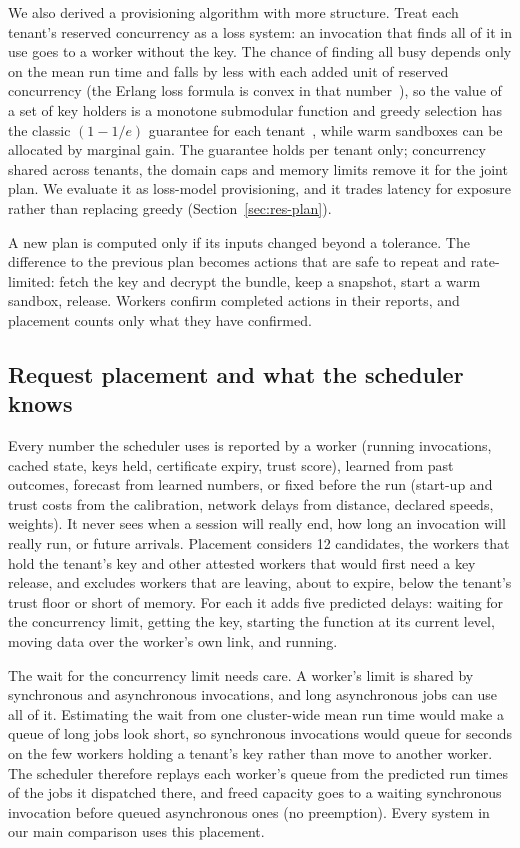 We also derived a provisioning algorithm with more structure. Treat each tenant's reserved concurrency as a loss system: an invocation that finds
all of it in use goes to a worker without the key. The chance of finding all busy depends only on the mean run time and falls
by less with each added unit of reserved concurrency (the Erlang loss formula is convex in that number~\cite{messerli1972}), so the value of a
set of key holders is a monotone submodular function and greedy selection has the classic $(1-1/e)$ guarantee for each
tenant~\cite{nemhauser1978,harshaw2019}, while warm sandboxes can be allocated by marginal gain. The guarantee holds per
tenant only; concurrency shared across tenants, the domain caps and memory limits remove it for the joint plan. We evaluate it as
loss-model provisioning, and it trades latency for exposure rather than replacing greedy (Section~\ref{sec:res-plan}).

A new plan is computed only if its inputs changed beyond a tolerance. The difference to the previous plan becomes actions that
are safe to repeat and rate-limited: fetch the key and decrypt the bundle, keep a snapshot, start a warm sandbox, release.
Workers confirm completed actions in their reports, and placement counts only what they have confirmed.

\subsection{Request placement and what the scheduler knows}
Every number the scheduler uses is reported by a worker (running invocations, cached state, keys held, certificate expiry, trust
score), learned from past outcomes, forecast from learned numbers, or fixed before the run (start-up and trust costs from
the calibration, network delays from distance, declared speeds, weights). It never sees when a session will really end, how
long an invocation will really run, or future arrivals. Placement considers 12 candidates, the workers that hold the tenant's
key and other attested workers that would first need a key release, and excludes workers that are leaving, about to
expire, below the tenant's trust floor or short of memory. For each it adds five predicted delays: waiting for the concurrency limit, getting
the key, starting the function at its current level, moving data over the worker's own link, and running.

The wait for the concurrency limit needs care. A worker's limit is shared by synchronous and asynchronous invocations, and long
asynchronous jobs can use all of it. Estimating the wait from one cluster-wide mean run time would make a queue of
long jobs look short, so synchronous invocations would queue for seconds on the few workers holding a tenant's key rather than
move to another worker. The scheduler therefore replays each worker's queue from the predicted run times of the jobs
it dispatched there, and freed capacity goes to a waiting synchronous invocation before queued asynchronous ones (no
preemption). Every system in our main comparison uses this placement.

